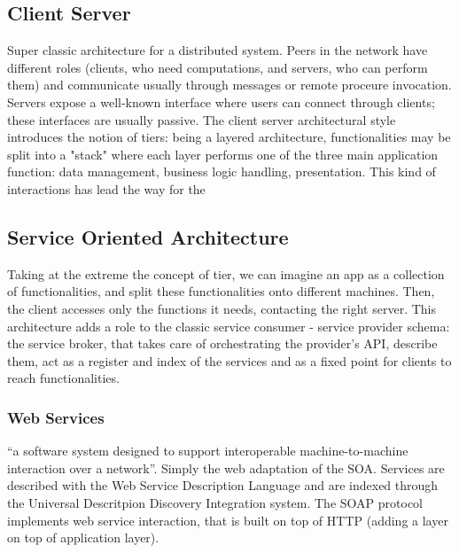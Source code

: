 \documentclass[10pt,a4paper]{article}
\begin{document}
			\subsection{Client Server}
				Super classic architecture for a distributed system. Peers in the network have different roles (clients, who need computations, and servers, who can perform them) and communicate usually through messages or remote proceure invocation.\\
				Servers expose a well-known interface where users can connect through clients; these interfaces are usually passive. The client server architectural style introduces the notion of tiers: being a layered architecture, functionalities may be split into a "stack" where each layer performs one of the three main application function: data management, business logic handling, presentation. This kind of interactions has lead the way for the 
			
			\subsection{Service Oriented Architecture}
				Taking at the extreme the concept of tier, we can imagine an app as a collection of functionalities, and split these functionalities onto different machines. Then, the client accesses only the functions it needs, contacting the right server. This architecture adds a role to the classic service consumer - service provider schema: the service broker, that takes care of orchestrating the provider's API, describe them, act as a register and index of the services and as a fixed point for clients to reach functionalities.
				
				\subsubsection{Web Services}
					“a software system designed to support interoperable machine-to-machine interaction over a network”. Simply the web adaptation of the SOA. Services are described with the Web Service Description Language and are indexed through the Universal Descritpion Discovery Integration system. The SOAP protocol implements web service interaction, that is built on top of HTTP (adding a layer on top of application layer).
					
\end{document}
